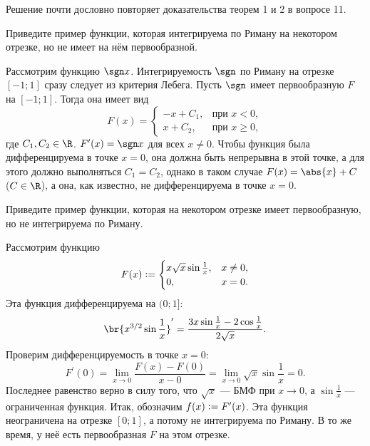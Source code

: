 \begin{solution}
    Решение почти дословно повторяет доказательства теорем 1 и 2 в вопросе 11.
\end{solution}

\begin{problem}[12$^\circ$]
    Приведите пример функции, которая интегрируема по Риману на некотором отрезке, но не имеет на нём первообразной.
\end{problem}

\begin{solution}
    Рассмотрим функцию $\sgn x$. Интегрируемость $\sgn$ по Риману на отрезке $[-1; 1]$ сразу следует из критерия Лебега. Пусть $\sgn$ имеет первообразную $F$ на $[-1; 1]$. Тогда она имеет вид
    \[
        F(x) =
        \begin{cases}
            -x + C_1,&\text{при $x < 0$},\\
            x + C_2,&\text{при $x \geqslant 0$},
        \end{cases}
    \]
    где $C_1, C_2 \in \R$. $F^\prime(x) = \sgn x$ для всех $x \ne 0$. Чтобы функция была дифференцируема в точке $x = 0$, она должна быть непрерывна в этой точке, а для этого должно выполняться $C_1 = C_2$, однако в таком случае $F(x) = \abs{x} + C$ ($C \in \R$), а она, как известно, не дифференцируема в точке $x = 0$.
\end{solution}

\begin{problem}[13$^\circ$]
    Приведите пример функции, которая на некотором отрезке имеет первообразную, но не интегрируема по Риману.
\end{problem}

\begin{solution}
    Рассмотрим функцию 
    \[
        F(x) \vcentcolon = 
        \begin{cases}
            x\sqrt{x}\sin\frac{1}{x},& x \ne 0,\\
            0,& x = 0.
        \end{cases}
    \]
    Эта функция дифференцируема на $(0; 1]$:
    \[
        \br{x^{3 / 2}\sin\frac{1}{x}}^\prime = \frac{3x\sin\frac{1}{x} - 2\cos\frac{1}{x}}{2\sqrt{x}}.
    \]
    Проверим дифференцируемость в точке $x = 0$:
    \[
        F^\prime(0) = \lim_{x \to 0}\frac{F(x) - F(0)}{x - 0} = \lim_{x \to 0}\sqrt{x}\sin\frac{1}{x} = 0.
    \]
    Последнее равенство верно в силу того, что $\sqrt{x}$ --- БМФ при $x \to 0$, а $\sin\frac{1}{x}$ --- ограниченная функция. Итак, обозначим $f(x) \vcentcolon = F^\prime(x)$. Эта функция неограничена на отрезке $[0; 1]$, а потому не интегрируема по Риману. В то же время, у неё есть первообразная $F$ на этом отрезке.
\end{solution}

